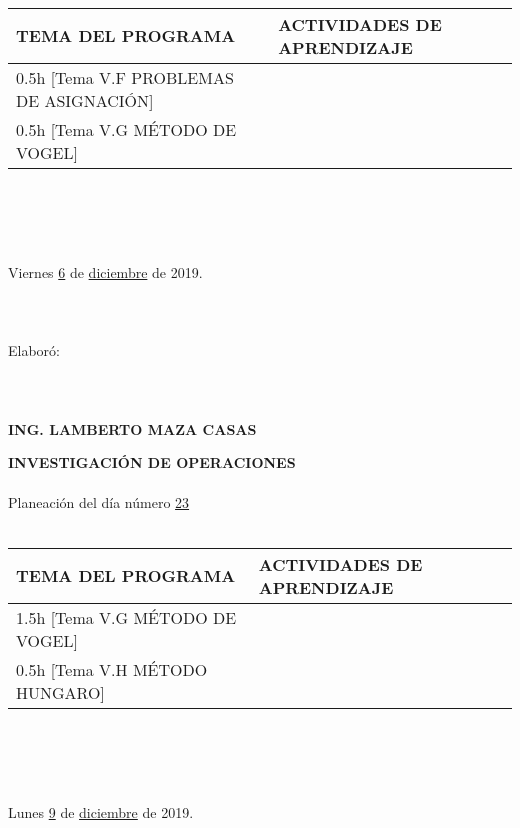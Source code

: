 \documentclass[landscape]{article}
\begin{document}
{\begin{center}
\ \\
\begin{tabular}{|p{11cm}|p{8cm}|}\hline
{\bf TEMA DEL PROGRAMA}&{\bf ACTIVIDADES DE APRENDIZAJE}\\\hline
	0.5h	[Tema V.F PROBLEMAS DE ASIGNACI\'ON]
&\\
	0.5h	[Tema V.G M\'ETODO DE VOGEL]
&\\
\hline
\end{tabular}
\ \\
\ \\
\ \\
\ \\
Viernes \underline{\hspace{0.5cm}6\hspace{0.5cm}} de  \underline{\hspace{0.5cm}diciembre\hspace{0.5cm}} de 2019.
\ \\
\ \\
\ \\
\ \\
Elabor\'o:
\ \\
\ \\
\ \\
\ \\
{\bf ING. LAMBERTO MAZA CASAS}
\end{center}
\eject
\begin{center}
{\bf 
INVESTIGACI\'ON DE OPERACIONES
}
\ \\
\ \\
Planeaci\'on del d\'ia n\'umero \underline{\hspace{0.5cm}23\hspace{0.5cm}}
\ \\
\ \\
\begin{tabular}{|p{11cm}|p{8cm}|}\hline
{\bf TEMA DEL PROGRAMA}&{\bf ACTIVIDADES DE APRENDIZAJE}\\\hline
	1.5h	[Tema V.G M\'ETODO DE VOGEL]
&\\
	0.5h	[Tema V.H M\'ETODO HUNGARO]
&\\
\hline
\end{tabular}
\ \\
\ \\
\ \\
\ \\
Lunes \underline{\hspace{0.5cm}9\hspace{0.5cm}} de  \underline{\hspace{0.5cm}diciembre\hspace{0.5cm}} de 2019.

\end{center}}
\end{document}
